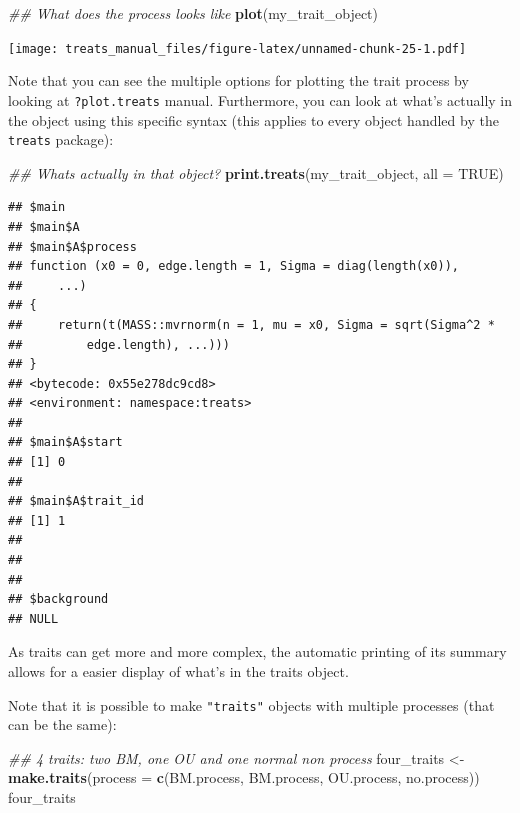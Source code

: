 \documentclass[
]{book}
\newenvironment{Shaded}{\begin{snugshade}}{\end{snugshade}}
\newcommand{\CommentTok}[1]{\textcolor[rgb]{0.56,0.35,0.01}{\textit{#1}}}
\newcommand{\DataTypeTok}[1]{\textcolor[rgb]{0.13,0.29,0.53}{#1}}
\newcommand{\KeywordTok}[1]{\textcolor[rgb]{0.13,0.29,0.53}{\textbf{#1}}}
\newcommand{\NormalTok}[1]{#1}
\newcommand{\OtherTok}[1]{\textcolor[rgb]{0.56,0.35,0.01}{#1}}
\newcommand{\StringTok}[1]{\textcolor[rgb]{0.31,0.60,0.02}{#1}}
\begin{document}
\begin{Shaded}
\begin{Highlighting}[]
\CommentTok{\#\# What does the process looks like}
\KeywordTok{plot}\NormalTok{(my\_trait\_object)}
\end{Highlighting}
\end{Shaded}

\texttt{[image: treats\_manual\_files/figure-latex/unnamed-chunk-25-1.pdf]}

Note that you can see the multiple options for plotting the trait process by looking at \texttt{?plot.treats} manual. Furthermore, you can look at what's actually in the object using this specific syntax (this applies to every object handled by the \texttt{treats} package):

\begin{Shaded}
\begin{Highlighting}[]
\CommentTok{\#\# What\textquotesingle{}s actually in that object?}
\KeywordTok{print.treats}\NormalTok{(my\_trait\_object, }\DataTypeTok{all =} \OtherTok{TRUE}\NormalTok{)}
\end{Highlighting}
\end{Shaded}

\begin{verbatim}
## $main
## $main$A
## $main$A$process
## function (x0 = 0, edge.length = 1, Sigma = diag(length(x0)), 
##     ...) 
## {
##     return(t(MASS::mvrnorm(n = 1, mu = x0, Sigma = sqrt(Sigma^2 * 
##         edge.length), ...)))
## }
## <bytecode: 0x55e278dc9cd8>
## <environment: namespace:treats>
## 
## $main$A$start
## [1] 0
## 
## $main$A$trait_id
## [1] 1
## 
## 
## 
## $background
## NULL
\end{verbatim}

As traits can get more and more complex, the automatic printing of its summary allows for a easier display of what's in the traits object.

Note that it is possible to make \texttt{"traits"} objects with multiple processes (that can be the same):

\begin{Shaded}
\begin{Highlighting}[]
\CommentTok{\#\# 4 traits: two BM, one OU and one normal non process}
\NormalTok{four\_traits \textless{}{-}}\StringTok{ }\KeywordTok{make.traits}\NormalTok{(}\DataTypeTok{process =} \KeywordTok{c}\NormalTok{(BM.process,}
\NormalTok{                                       BM.process,}
\NormalTok{                                       OU.process,}
\NormalTok{                                       no.process))}
\NormalTok{four\_traits}
\end{Highlighting}
\end{Shaded}
\end{document}
